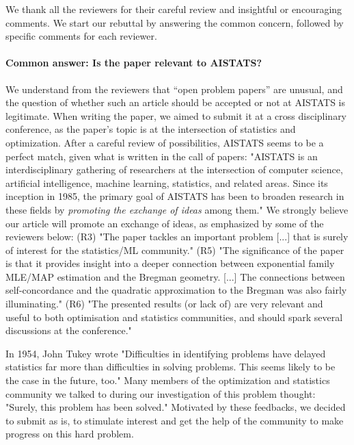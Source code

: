 
\fi


We thank all the reviewers for their careful review and insightful or encouraging comments. We start our rebuttal by answering the common concern, followed by specific comments for each reviewer.
	
\paragraph{Common answer: Is the paper relevant to AISTATS?}
We understand from the reviewers that “open problem papers”  are unusual, and the question of whether such an article should be accepted or not at AISTATS is legitimate. 
When writing the paper, we aimed to submit it at a cross disciplinary conference, as the paper’s topic is at the intersection of statistics and optimization. After a careful review of possibilities, AISTATS seems to be a perfect match, given what is written in the call of papers:
"AISTATS is an interdisciplinary gathering of researchers at the intersection of computer science, artificial intelligence, machine learning, statistics, and related areas. Since its inception in 1985, the primary goal of AISTATS has been to broaden research in these fields by \emph{promoting the exchange of ideas} among them."  
We strongly believe our article will promote an exchange of ideas, as emphasized by some of the reviewers below:
(R3) "The paper tackles an important problem [...] that is surely of interest for the statistics/ML community."
(R5)  "The significance of the paper is that it provides insight into a deeper connection between exponential family MLE/MAP estimation and the Bregman geometry. [...]  The connections between self-concordance and the quadratic approximation to the Bregman was also fairly illuminating."
(R6) "The presented results (or lack of) are very relevant and useful to both optimisation and statistics communities, and should spark several discussions at the conference."

In 1954, John Tukey  \nocite{tukey1954unsolved} wrote "Difficulties in identifying problems have delayed statistics far more than difficulties in solving problems. This seems likely to be the case in the future, too."
Many members of the optimization and statistics community we talked to during our investigation of this problem thought: "Surely, this problem has been solved."
Motivated by these feedbacks, we decided to submit as is, 
to stimulate interest and get the help of the community to make progress on this hard problem.


